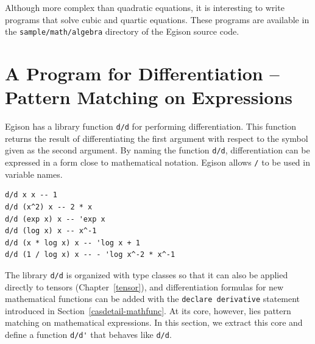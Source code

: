 Although more complex than quadratic equations, it is interesting to write programs that solve cubic and quartic equations.
These programs are available in the \texttt{sample/math/algebra} directory of the Egison source code.

\section{A Program for Differentiation -- Pattern Matching on Expressions}\label{cas-derivative}

Egison has a library function \lstinline{d/d} for performing differentiation.
This function returns the result of differentiating the first argument with respect to the symbol given as the second argument.
By naming the function \lstinline{d/d}, differentiation can be expressed in a form close to mathematical notation.
Egison allows \lstinline{/} to be used in variable names.
\begin{lstlisting}[language=egison,numbers=none]
d/d x x -- 1
d/d (x^2) x -- 2 * x
d/d (exp x) x -- 'exp x
d/d (log x) x -- x^-1
d/d (x * log x) x -- 'log x + 1
d/d (1 / log x) x -- - 'log x^-2 * x^-1
\end{lstlisting}
The library \lstinline{d/d} is organized with type classes so that it can also be applied directly to tensors (Chapter~\ref{tensor}), and differentiation formulas for new mathematical functions can be added with the \lstinline{declare derivative} statement introduced in Section~\ref{casdetail-mathfunc}.
At its core, however, lies pattern matching on mathematical expressions.
In this section, we extract this core and define a function \lstinline{d/d'} that behaves like \lstinline{d/d}.

